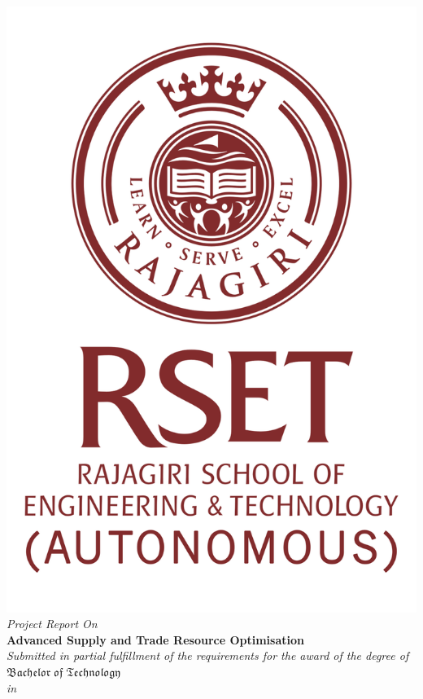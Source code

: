 \begin{center}
	\includegraphics[scale=0.35]{Figures/logo1.png}\\[0.5cm]
	\large \textit{Project Report On}\\[0.5cm]
	\Large \textbf{Advanced Supply and Trade Resource Optimisation}\\[0.5cm]
	\textit{Submitted in partial fulfillment of the
		requirements for the award of the degree of}\\[0.5cm]
	{\huge {$\mathfrak {Bachelor\; of\; Technology}$}}\\[.5cm]
	\textit{in}\\[.5cm]

\end{center}
